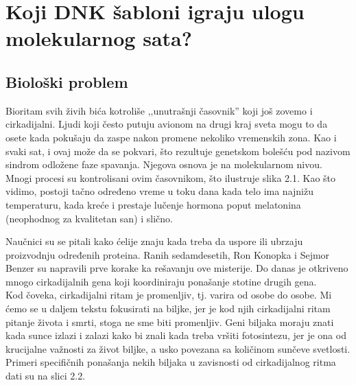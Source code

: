 \chapter{Koji DNK šabloni igraju ulogu molekularnog sata?}
\section{Biološki problem}

Bioritam svih živih bića kotroliše ‚‚unutrašnji časovnik'' koji još zovemo i cirkadijalni. Ljudi koji često putuju avionom na drugi kraj sveta mogu to da osete kada pokušaju da zaspe nakon promene nekoliko vremenskih zona. Kao i svaki sat, i ovaj može da se pokvari, što rezultuje genetskom bolešću pod nazivom sindrom odložene faze spavanja. Njegova osnova je na molekularnom nivou. Mnogi procesi su kontrolisani ovim časovnikom, što ilustruje slika 2.1. Kao što vidimo, postoji tačno određeno vreme u toku dana kada telo ima najnižu temperaturu, kada kreće i prestaje lučenje hormona poput melatonina (neophodnog za kvalitetan san) i slično.

Naučnici su se pitali kako ćelije znaju kada treba da uspore ili ubrzaju proizvodnju određenih proteina. Ranih sedamdesetih, Ron Konopka i Sejmor Benzer su napravili prve korake ka rešavanju ove misterije. Do danas je otkriveno mnogo cirkadijalnih gena koji koordiniraju ponašanje stotine drugih gena. \\
\indent Kod čoveka, cirkadijalni ritam je promenljiv, tj. varira od osobe do osobe. Mi ćemo se u daljem tekstu fokusirati na biljke, jer je kod njih cirkadijalni ritam pitanje života i smrti, stoga ne sme biti promenljiv. Geni biljaka moraju znati kada sunce izlazi i zalazi kako bi znali kada treba vršiti fotosintezu, jer je ona od krucijalne važnosti za život biljke, a usko povezana sa količinom sunčeve svetlosti. Primeri specifičnih ponašanja nekih biljaka u zavisnosti od cirkadijalnog ritma dati su na slici 2.2.

